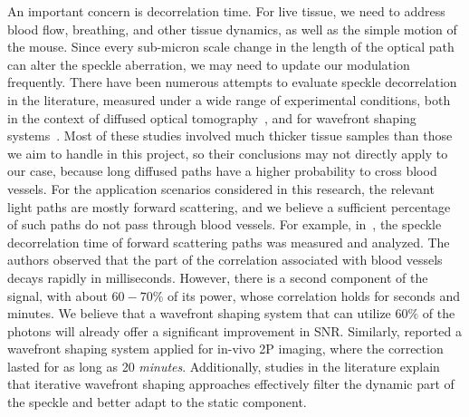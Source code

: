 An important concern is decorrelation time. For live tissue, we need to address blood flow, breathing, and other tissue dynamics, as well as the simple motion of the mouse. Since every sub-micron scale change in the length of the optical path can alter the speckle aberration, we may need to update our modulation frequently.
There have been numerous attempts to evaluate speckle decorrelation in the literature, measured under a wide range of experimental conditions, both in the context of diffused optical tomography~\cite{Durduran2010,berne2000dynamic,Boas:97,DynamicLightScattering}, and for wavefront shaping systems~\cite{Cui2010,Jang:15,Qureshi:17}. Most of these studies involved much thicker tissue samples than those we aim to handle in this project, so their conclusions may not directly apply to our case, because long diffused paths have a higher probability to cross blood vessels. 
For the application scenarios considered in this research, the relevant light paths are mostly forward scattering, and we believe a sufficient percentage of such paths do not pass through blood vessels. For example, in~\cite{Yang2020Fighting}, the speckle decorrelation time of forward scattering paths was measured and analyzed. The authors observed that the part of the correlation associated with blood vessels decays rapidly in milliseconds. However, there is a second component of the signal, with about $60-70\%$ of its power, whose correlation holds for seconds and minutes. We believe that a wavefront shaping system that can utilize $60\%$ of the photons will already offer a significant improvement in SNR.
Similarly,\cite{Papadopoulos16} reported a wavefront shaping system applied for in-vivo 2P imaging, where the correction lasted for as long as 20 {\em minutes}. Additionally, studies in the literature explain that iterative wavefront shaping approaches effectively filter the dynamic part of the speckle and better adapt to the static component\cite{GU1994353,Blochet:19}.

